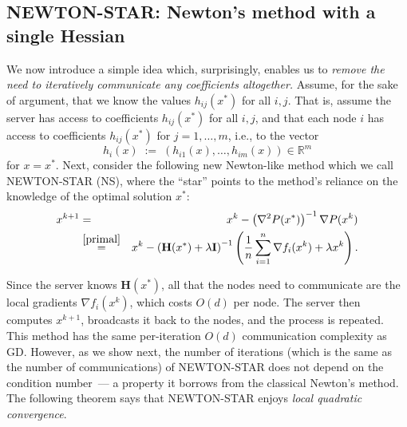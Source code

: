 \documentclass[12pt]{article}
\newcommand{\eqdef}{\; { := }\;}
\newcommand{\R}{\mathbb{R}}
\newcommand{\newalpha}{h}
\newcommand{\mH}{\mathbf{H}}
\newcommand{\mI}{\mathbf{I}}
\begin{document}
\subsection{{\sf NEWTON-STAR}: Newton's method with a single Hessian} \label{subsec:Newton-star}

We now introduce a simple idea which, surprisingly, enables us to {\em remove the need to iteratively communicate any coefficients altogether.}  Assume, for the sake of argument, that we know the values  $\newalpha_{ij}(x^*)$ for all $i,j$. That is, assume the server has access to coefficients $\newalpha_{ij}(x^*)$ for all $i,j$, and that each node $i$ has access to coefficients $\newalpha_{ij}(x^*)$  for $j=1,\dots,m$, i.e., to the vector
\begin{equation}\label{eq:8f0d8hfd}\newalpha_{i}(x) \eqdef (\newalpha_{i1}(x),\dots, \newalpha_{im}(x)) \in \R^m\end{equation}
for $x=x^*$.  Next, consider the following new Newton-like method which we call {\sf NEWTON-STAR (NS)}, where the ``star'' points to the method's reliance on the knowledge of the optimal solution $x^*$:
\begin{eqnarray}  x^{k+1} &=& x^k - \left(\nabla^2 P(x^*) \right)^{-1} \nabla P(x^k)\notag\\ 
&\overset{\eqref{primal}}{=}& x^k - \left(\mH(x^*) +\lambda \mI \right)^{-1} \left(\frac{1}{n}\sum_{i=1}^n \nabla f_i(x^k) + \lambda x^k\right).\label{eq:Newton-star}\end{eqnarray}

Since the server knows $\mH(x^*)$, all that the nodes need to communicate are the local gradients $\nabla f_i(x^k)$, which costs $O(d)$ per node. The server then computes $x^{k+1}$, broadcasts it back to the nodes, and the process is repeated. This method has the same per-iteration $O(d)$ communication complexity as GD. However, as we show next, the number of iterations (which is the same as the number of communications) of {\sf NEWTON-STAR} does not depend on the condition number~--- a property it borrows from the classical Newton's method. The following theorem says that {\sf NEWTON-STAR} enjoys {\em local quadratic convergence}.
\end{document}
